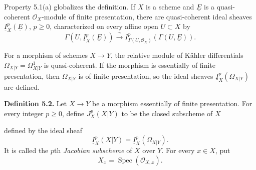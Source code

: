Property 5.1(a) globalizes the definition. If $X$ is a scheme and
$\underline E$ is a quasi-coherent $\mathcal O_X$-module of finite
presentation, there are quasi-coherent ideal sheaves
$\underline I_X^p(\underline E)$, $p\geq0$, characterized on every
affine open $U\subset X$ by
\[
\Gamma(U,\underline I_X^p(\underline E))
\xrightarrow{\ \sim\ }
I_{\Gamma(U,\mathcal O_X)}^p(\Gamma(U,\underline E)).
\]

For a morphism of schemes $X\longrightarrow Y$, the relative module
of K\"ahler differentials
$\Omega_{X|Y}=\Omega^1_{X|Y}$ is quasi-coherent. If the morphism is
essentially of finite presentation, then $\Omega_{X|Y}$ is of finite
presentation, so the ideal sheaves
$\underline I_X^p(\Omega_{X|Y})$ are defined.

\medskip
\noindent\textbf{Definition 5.2.}
Let $X\longrightarrow Y$ be a morphism essentially of finite
presentation. For every integer $p\geq0$, define $J_X^p(X|Y)$ to be
the closed subscheme of $X$


\noindent defined by the ideal sheaf
\[
\underline I_X^p(X|Y)=\underline I_X^p(\Omega_{X|Y}).
\]
It is called the $p$th \emph{Jacobian subscheme} of $X$ over $Y$.
For every $x\in X$, put
\[
X_x=\operatorname{Spec}(\mathcal O_{X,x}).
\]

